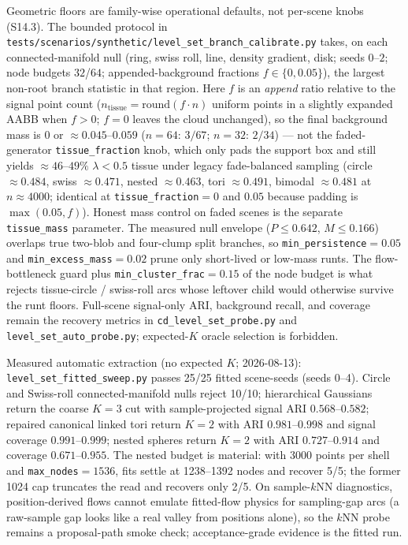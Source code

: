 \documentclass[11pt]{article}
\begin{document}
Geometric floors are family-wise operational defaults, not per-scene
knobs (S14.3). The bounded protocol in
\texttt{tests/scenarios/synthetic/level\_set\_branch\_calibrate.py}
takes, on each connected-manifold null (ring, swiss roll, line, density
gradient, disk; seeds $0$--$2$; node budgets $32$/$64$; appended-background
fractions $f\in\{0,0.05\}$), the largest non-root branch statistic in that
region. Here $f$ is an \emph{append} ratio relative to the signal point
count ($n_{\mathrm{tissue}}=\mathrm{round}(f\cdot n)$ uniform points in a
slightly expanded AABB when $f>0$; $f{=}0$ leaves the cloud unchanged), so
the final background mass is $0$ or $\approx 0.045$--$0.059$
($n{=}64$: $3/67$; $n{=}32$: $2/34$) --- not the faded-generator
\texttt{tissue\_fraction} knob, which only pads the support box and still
yields $\approx 46$--$49\%$ $\lambda{<}0.5$ tissue under legacy
fade-balanced sampling (circle $\approx 0.484$, swiss $\approx 0.471$,
nested $\approx 0.463$, tori $\approx 0.491$, bimodal $\approx 0.481$ at
$n{\approx}4000$; identical at \texttt{tissue\_fraction}${}=0$ and
$0.05$ because padding is $\max(0.05,f)$). Honest mass control on faded
scenes is the separate \texttt{tissue\_mass} parameter. The
measured null envelope ($P\le 0.642$, $M\le 0.166$) overlaps true two-blob
and four-clump split branches, so
\texttt{min\_persistence}${}=0.05$ and
\texttt{min\_excess\_mass}${}=0.02$ prune only short-lived or low-mass
runts. The flow-bottleneck guard plus
\texttt{min\_cluster\_frac}${}=0.15$ of the node budget is what rejects
tissue-circle / swiss-roll arcs whose leftover child would otherwise
survive the runt floors. Full-scene signal-only ARI, background recall,
and coverage remain the recovery metrics in
\texttt{cd\_level\_set\_probe.py} and
\texttt{level\_set\_auto\_probe.py}; expected-$K$
oracle selection is forbidden.

Measured automatic extraction (no expected $K$; 2026-08-13):
\texttt{level\_set\_fitted\_sweep.py} passes 25/25 fitted scene-seeds
(seeds 0--4). Circle and Swiss-roll connected-manifold nulls reject
10/10; hierarchical Gaussians return the coarse $K{=}3$ cut with
sample-projected signal ARI $0.568$--$0.582$; repaired canonical linked
tori return $K{=}2$ with ARI $0.981$--$0.998$ and signal coverage
$0.991$--$0.999$; nested spheres return $K{=}2$ with ARI
$0.727$--$0.914$ and coverage $0.671$--$0.955$. The nested budget is
material: with $3000$ points per shell and
\texttt{max\_nodes}${}=1536$, fits settle at 1238--1392 nodes and recover
5/5; the former 1024 cap truncates the read and recovers only 2/5. On
sample-$k$NN diagnostics, position-derived flows cannot emulate
fitted-flow physics for sampling-gap arcs (a raw-sample gap looks like a
real valley from positions alone), so the $k$NN probe remains a
proposal-path smoke check; acceptance-grade evidence is the fitted run.
\end{document}
